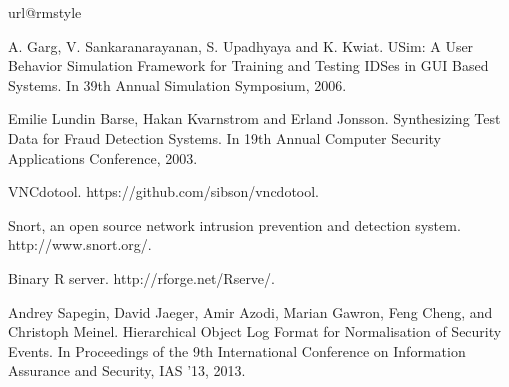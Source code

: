
%
%
%

\begin{thebibliography}{10}
\providecommand{\url}[1]{#1}
\csname url@rmstyle\endcsname
\providecommand{\newblock}{\relax}
\providecommand{\bibinfo}[2]{#2}
\providecommand\BIBentrySTDinterwordspacing{\spaceskip=0pt\relax}
\providecommand\BIBentryALTinterwordstretchfactor{4}
\providecommand\BIBentryALTinterwordspacing{\spaceskip=\fontdimen2\font plus
\BIBentryALTinterwordstretchfactor\fontdimen3\font minus
  \fontdimen4\font\relax}
\providecommand\BIBforeignlanguage[2]{{%
\expandafter\ifx\csname l@#1\endcsname\relax
\typeout{** WARNING: IEEEtran.bst: No hyphenation pattern has been}%
\typeout{** loaded for the language `#1'. Using the pattern for}%
\typeout{** the default language instead.}%
\else
\language=\csname l@#1\endcsname
\fi
#2}}











A. Garg, V. Sankaranarayanan, S. Upadhyaya and K. Kwiat. USim: A User Behavior Simulation Framework for Training and Testing IDSes in GUI Based Systems. In 39th Annual Simulation Symposium, 2006.

Emilie Lundin Barse, Hakan Kvarnstrom and Erland Jonsson. Synthesizing Test Data for Fraud Detection Systems. In 19th Annual Computer Security Applications Conference, 2003.

VNCdotool. https://github.com/sibson/vncdotool.



Snort, an open source network intrusion prevention and detection system. http://www.snort.org/.



Binary R server. http://rforge.net/Rserve/.


Andrey Sapegin, David Jaeger, Amir Azodi, Marian Gawron, Feng Cheng, and Christoph Meinel. Hierarchical Object Log Format for Normalisation of Security Events. In Proceedings of the 9th International Conference on Information Assurance and Security, IAS '13, 2013.


\end{thebibliography}
